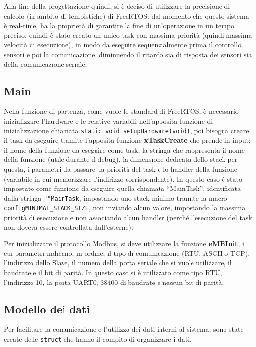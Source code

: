 \documentclass[a4paper,titlepage]{book}
\begin{document}
Alla fine della progettazione quindi, si è deciso di utilizzare la precisione di calcolo (in ambito di tempistiche) di FreeRTOS: dal momento che questo sistema è real-time, ha la proprietà di garantire la fine di un'operazione in un tempo preciso, quindi è stato creato un unico task con massima priorità (quindi massima velocità di esecuzione), in modo da eseguire sequenzialmente prima il controllo sensori e poi la comunicazione, diminuendo il ritardo sia di risposta dei sensori sia della comunicazione seriale.

\subsection{Main}

Nella funzione di partenza, come vuole lo standard di FreeRTOS, è necessario inizializzare l'hardware e le relative variabili nell'apposita funzione di inizializzazione chiamata \lstinline!static void setupHardware(void)!, poi bisogna creare il task da eseguire tramite l'apposita funzione \textbf{xTaskCreate} che prende in input: il nome della funzione da eseguire come task, la stringa che rappresenta il nome della funzione (utile durante il debug), la dimensione dedicata dello stack per questa, i parametri da passare, la priorità del task e lo handler della funzione (variabile in cui memorizzare l'indirizzo corrispondente). In questo caso è stato impostato come funzione da eseguire quella chiamata ``MainTask'', identificata dalla stringa \lstinline!""MainTask!, impostando uno stack minimo tramite la macro \lstinline!configMINIMAL_STACK_SIZE!, non inviando alcun valore, impostando la massima priorità di esecuzione e non associando alcun handler (perché l'esecuzione del task non doveva essere controllata dall'esterno).

Per inizializzare il protocollo Modbus, si deve utilizzare la funzione \textbf{eMBInit}, i cui parametri indicano, in ordine, il tipo di comunicazione (RTU, ASCII o TCP), l'indirizzo dello Slave, il numero della porta seriale che si vuole utilizzare, il baudrate e il bit di parità.
In questo caso si è utilizzato come tipo RTU, l'indirizzo 10, la porta UART0, 38400 di baudrate e nessun bit di parità.

\subsection{Modello dei dati}

Per facilitare la comunicazione e l'utilizzo dei dati interni al sistema, sono state create delle \lstinline!struct! che hanno il compito di organizzare i dati.
\end{document}
